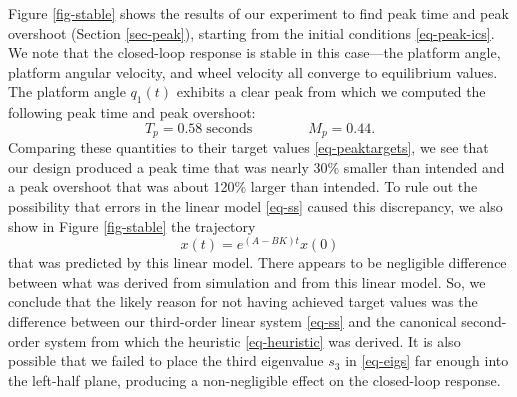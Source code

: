 \documentclass[conf]{new-aiaa}
\begin{document}
Figure \ref{fig-stable} shows the results of our experiment to find peak time and peak overshoot (Section \ref{sec-peak}), starting from the initial conditions \eqref{eq-peak-ics}.
We note that the closed-loop response is stable in this case---the platform angle, platform angular velocity, and wheel velocity all converge to equilibrium values.
The platform angle $q_{1}(t)$ exhibits a clear peak from which we computed the following peak time and peak overshoot:
\begin{equation}
T_{p} = 0.58\;\text{seconds}
\qquad\qquad
M_{p} = 0.44.
\end{equation}
Comparing these quantities to their target values \eqref{eq-peaktargets}, we see that our design produced a peak time that was nearly 30\% smaller than intended and a peak overshoot that was about 120\% larger than intended.
To rule out the possibility that errors in the linear model \eqref{eq-ss} caused this discrepancy, we also show in Figure \ref{fig-stable} the trajectory
\begin{equation}
x(t) = e^{(A - BK)t}x(0)
\end{equation}
that was predicted by this linear model. There appears to be negligible difference between what was derived from simulation and from this linear model. So, we conclude that the likely reason for not having achieved target values was the difference between our third-order linear system \eqref{eq-ss} and the canonical second-order system from which the heuristic \eqref{eq-heuristic} was derived. It is also possible that we failed to place the third eigenvalue $s_{3}$ in \eqref{eq-eigs} far enough into the left-half plane, producing a non-negligible effect on the closed-loop response.
\end{document}
